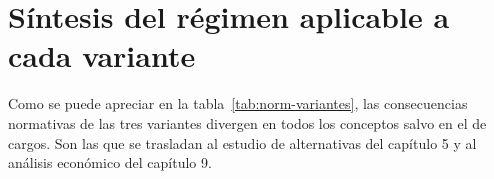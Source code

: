 
\section{Síntesis del régimen aplicable a cada variante}
\label{sec:norm-sintesis}

Como se puede apreciar en la tabla~\ref{tab:norm-variantes}, las consecuencias normativas de las tres variantes divergen en todos los conceptos salvo en el de cargos. Son las que se trasladan al estudio de alternativas del capítulo 5 y al análisis económico del capítulo 9.

